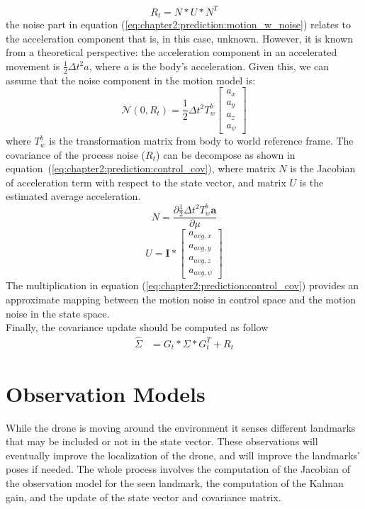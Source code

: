 \begin{equation}
    R_t = N * U * N^T
    \label{eq:chapter2:prediction:control_cov}
\end{equation}
the noise part in equation (\ref{eq:chapter2:prediction:motion_w_noise}) relates to the acceleration component that is, in this case, unknown. However, it is known from a theoretical perspective: the acceleration component in an accelerated movement is $\frac{1}{2}\Delta t^2 a$, where $a$ is the body's acceleration. Given this, we can assume that the noise component in the motion model is:
\begin{equation}
    \mathcal{N}\left(0, R_t\right) = \frac{1}{2} \Delta t^2 T_w^b \begin{bmatrix}
        a_x \\ a_y \\ a_z \\ a_{\psi}
    \end{bmatrix}
\end{equation}
where $T_w^b$ is the transformation matrix from body to world reference frame. The covariance of the process noise ($R_t$) can be decompose as shown in equation~(\ref{eq:chapter2:prediction:control_cov}), where matrix $N$ is the Jacobian of acceleration term  with respect to the state vector, and matrix $U$ is the estimated average acceleration.
\begin{equation}
    N = \frac{\partial \frac{1}{2} \Delta t^2 T_w^b \textbf{a}}{\partial \mu}
\end{equation}
\begin{equation}
    U = \textbf{I} * \begin{bmatrix}
        a_{avg, x} \\ a_{avg, y} \\ a_{avg, z} \\ a_{avg, \psi}
    \end{bmatrix}
\end{equation}
The multiplication in equation (\ref{eq:chapter2:prediction:control_cov}) provides an approximate mapping between the motion noise in control space and the motion noise in the state space.\\

Finally, the covariance update should be computed as follow
\begin{align}
    \hat\Sigma &= G_t * \Sigma * G_t^T + R_t
\end{align}

\section{Observation Models}
\label{sec:chapter2:correction}
While the drone is moving around the environment it senses different landmarks that may be included or not in the state vector. These observations will eventually improve the localization of the drone, and will improve the landmarks' poses if needed. The whole process involves the computation of the Jacobian of the observation model for the seen landmark, the computation of the Kalman gain, and the update of the state vector and covariance matrix.\\

